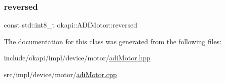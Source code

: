 \mbox{\label{classokapi_1_1ADIMotor_a3abbe2875ba0abb35297d8dbe91cd4f4}} 
\subsubsection{\texorpdfstring{reversed}{reversed}}
{\footnotesize\ttfamily const std\+::int8\+\_\+t okapi\+::\+A\+D\+I\+Motor\+::reversed\hspace{0.3cm}{\ttfamily [protected]}}



The documentation for this class was generated from the following files\+:\begin{DoxyCompactItemize}
\item 
include/okapi/impl/device/motor/\mbox{\hyperlink{adiMotor_8hpp}{adi\+Motor.\+hpp}}\item 
src/impl/device/motor/\mbox{\hyperlink{adiMotor_8cpp}{adi\+Motor.\+cpp}}\end{DoxyCompactItemize}
